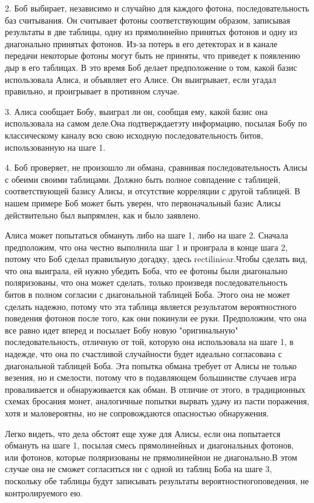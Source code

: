 2. Боб выбирает, независимо и случайно для каждого фотона, последовательность баз считывания. Он считывает фотоны соответствующим образом, записывая результаты в две таблицы, одну из прямолинейно принятых фотонов и одну из диагонально принятых фотонов. Из-за потерь в его детекторах и в канале передачи некоторые фотоны могут быть не приняты, что приведет к появлению дыр в его таблицах. В это время Боб делает предположение о том, какой базис использовала Алиса, и объявляет его Алисе. Он выигрывает, если угадал правильно, и проигрывает в противном случае.

­­3. Алиса сообщает Бобу, выиграл ли он, сообщая ему, какой базис она использовала на самом деле.Она подтверждаетэту информацию, посылая Бобу по классическому каналу всю свою исходную последовательность битов, использованную на шаге 1.

4. Боб проверяет, не произошло ли обмана, сравнивая последовательность Алисы с обеими своими таблицами. Должно быть полное совпадение с таблицей, соответствующей базису Алисы, и отсутствие корреляции с другой таблицей. В нашем примере Боб может быть уверен, что первоначальный базис Алисы действительно был выпрямлен, как и было заявлено.

­Алиса может попытаться обмануть либо на шаге 1, либо на шаге 2. Сначала предположим, что она честно выполнила шаг 1 и проиграла в конце шага 2, потому что Боб сделал правильную догадку, здесь rectiliniear.Чтобы сделать вид, что она выиграла, ей нужно убедить Боба, что ее фотоны были диагонально поляризованы, что она может сделать, только произведя последовательность битов в полном согласии с диагональной таблицей Боба. Этого она не может сделать надежно, потому что эта таблица является результатом вероятностного поведения фотонов после того, как они покинули ее руки. Предположим, что она все равно идет вперед и посылает Бобу новую "оригинальную" последовательность, отличную от той, которую она использовала на шаге 1, в надежде, что она по счастливой случайности будет идеально согласована с диагональной таблицей Боба. Эта попытка обмана требует от Алисы не только везения, но и смелости, потому что в подавляющем большинстве случаев игра проваливается и обнаруживается как обман. В отличие от этого, в традиционных схемах бросания монет, аналогичные попытки вырвать удачу из пасти поражения, хотя и маловероятны, но не сопровождаются опасностью обнаружения.

­­­Легко видеть, что дела обстоят еще хуже для Алисы, если она попытается обмануть на шаге 1, посылая смесь прямолинейных и диагональных фотонов, или фотонов, которые поляризованы не прямолинейнои не диагонально.В этом случае она не сможет согласиться ни с одной из таблиц Боба на шаге 3, поскольку обе таблицы будут записывать результаты вероятностногоповедения, не контролируемого ею.

